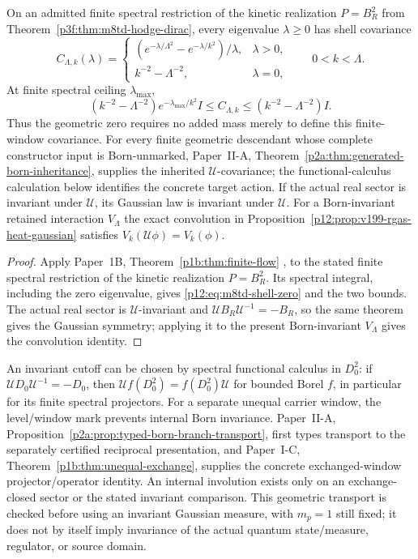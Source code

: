 \documentclass[12pt,a4paper]{article}
\begin{document}
\begin{corollary}
\label{p12:cor:m8td-shell-covariance}
On an admitted finite spectral restriction of the kinetic realization
$P=B_R^2$ from Theorem~\ref{p3f:thm:m8td-hodge-dirac}, every eigenvalue
$\lambda\ge0$ has shell covariance
\begin{equation}
 C_{\Lambda,k}(\lambda)=
 \begin{cases}
 (e^{-\lambda/\Lambda^2}-e^{-\lambda/k^2})/\lambda,&\lambda>0,\\
 k^{-2}-\Lambda^{-2},&\lambda=0,
 \end{cases}\qquad 0<k<\Lambda.
 \label{p12:eq:m8td-shell-zero}
\end{equation}
At finite spectral ceiling $\lambda_{\max}$,
\[
 (k^{-2}-\Lambda^{-2})e^{-\lambda_{\max}/k^2}I
 \le C_{\Lambda,k}\le(k^{-2}-\Lambda^{-2})I.
\]
Thus the geometric zero requires no added mass merely to define this
finite-window covariance.  For every finite geometric descendant whose
complete constructor input is Born-unmarked, Paper~II-A,
Theorem~\ref{p2a:thm:generated-born-inheritance}, supplies the inherited
$\mathcal U$-covariance; the functional-calculus calculation below identifies
the concrete target action.  If the actual real sector is invariant under
$\mathcal U$, its Gaussian law is invariant under $\mathcal U$. For a
Born-invariant retained interaction $V_\Lambda$ the exact convolution in
Proposition~\ref{p12:prop:v199-rgas-heat-gaussian} satisfies
$V_k(\mathcal U\phi)=V_k(\phi)$.
\end{corollary}
\begin{proof}
Apply Paper~1B, Theorem~\ref{p1b:thm:finite-flow}
\cite{Kugelmann2026Paper1B}, to the stated finite spectral restriction
of the kinetic realization $P=B_R^2$. Its spectral integral, including
the zero eigenvalue, gives \eqref{p12:eq:m8td-shell-zero} and the two
bounds. The actual real sector is $\mathcal U$-invariant and
$\mathcal UB_R\mathcal U^{-1}=-B_R$, so the same theorem gives
the Gaussian symmetry; applying it to the present Born-invariant
$V_\Lambda$ gives the convolution identity.
\end{proof}

An invariant cutoff can be chosen by spectral functional calculus in
\(D_0^2\): if \(\mathcal UD_0\mathcal U^{-1}=-D_0\), then
\(\mathcal U f(D_0^2)=f(D_0^2)\mathcal U\) for bounded Borel
\(f\), in particular for its finite spectral projectors.  For a separate
unequal carrier window, the level/window mark prevents internal Born
invariance.  Paper~II-A,
Proposition~\ref{p2a:prop:typed-born-branch-transport}, first types transport
to the separately certified reciprocal presentation, and Paper~I-C,
Theorem~\ref{p1b:thm:unequal-exchange}, supplies the concrete exchanged-window
projector/operator identity.  An internal involution exists only on an
exchange-closed sector or the stated invariant comparison.  This geometric
transport is checked before using an invariant Gaussian measure, with
\(m_p=1\) still fixed; it does not by itself imply invariance of the actual
quantum state/measure, regulator, or source domain.
\end{document}
